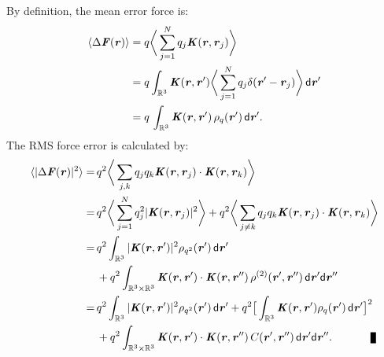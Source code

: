 \documentclass[aps,pre,preprint,unsortedaddress]{revtex4}
\renewcommand{\v}[1]{\textbf{\textit{#1}}}
\renewcommand{\d}[1]{\textsf{#1}}
\newenvironment{proof}[1][Proof]{\begin{trivlist}
\item[\hskip \labelsep {\bfseries #1}]}{\end{trivlist}}
\newcommand{\qed}{\nobreak \ifvmode \relax \else
      \ifdim\lastskip<1.5em \hskip-\lastskip
      \hskip1.5em plus0em minus0.5em \fi \nobreak
      \vrule height0.75em width0.5em depth0.25em\fi}
\begin{document}
\begin{proof}
  By definition, the mean error force is:
  \begin{align*}
    \langle\Delta\v F(\v r)\rangle
    &=
    q\bigg\langle \sum_{j=1}^Nq_j\v K(\v r,\v r_j)\bigg\rangle\\
    &=
    q\int_{\mathbb R^3}\v K(\v r, \v r')
    \bigg\langle \sum_{j=1}^Nq_j\delta (\v r' -\v r_j)\bigg\rangle
    \,\d d\v r'\\
    &= 
    q\,\int_{\mathbb R^3}\v K(\v r,\v r')\,\rho_q(\v r')\,\d d\v r'.
  \end{align*}
  The RMS force error is calculated by:
  \begin{align} \nonumber
    \langle\vert\Delta\v F(\v r)\vert^2\rangle
    =\,&
    q^2\bigg\langle\sum_{j,k}
    q_jq_k\v K(\v r, \v r_j)\cdot\v K(\v r, \v r_k)\bigg\rangle \\ \nonumber
    =\,&
    q^2\bigg\langle\sum_{j=1}^N
    q_j^2\vert\v K(\v r, \v r_j)\vert^2
    \bigg\rangle +
    q^2\bigg\langle\sum_{j\neq k}
    q_jq_k \v K(\v r, \v r_j)\cdot\v K(\v r, \v r_k)
    \bigg\rangle \\ \nonumber
    =\,&
    q^2\int_{\mathbb R^3}
    \vert\v K(\v r, \v r')\vert^2\rho_{q^2}(\v r')\,\d d\v r'
    \\\label{eqn:prf-error-step3}
    & +
    q^2\int_{\mathbb R^3\times\mathbb R^3}
    \v K(\v r , \v r')\cdot\v K(\v r , \v r'')\,
    \rho^{(2)}(\v r', \v r'')
    \,\d d\v r'\d d\v r''\\\nonumber
    =\,&
    q^2\int_{\mathbb R^3}
    \vert\v K(\v r , \v r')\vert^2\rho_{q^2}(\v r')\,\d d\v r'
    +
    q^2
    \big[
    \int_{\mathbb R^3}
    \v K(\v r , \v r')\rho_{q}(\v r')\,\d d\v r'
    \big]^2
    \\ \nonumber
    & +
    q^2\int_{\mathbb R^3\times\mathbb R^3}
    \v K(\v r , \v r')\cdot\v K(\v r , \v r'')\,
    C(\v r', \v r'')
    \,\d d\v r'\d d\v r''.\qquad\qed
  \end{align}
\end{proof}
\end{document}
